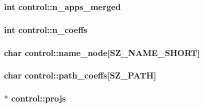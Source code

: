 \subsubsection[{\texorpdfstring{n\+\_\+apps\+\_\+merged}{n_apps_merged}}]{\setlength{\rightskip}{0pt plus 5cm}int control\+::n\+\_\+apps\+\_\+merged}\hypertarget{structcontrol_abbe1758b776d494be512904ee15314ad}{}\label{structcontrol_abbe1758b776d494be512904ee15314ad}
\subsubsection[{\texorpdfstring{n\+\_\+coeffs}{n_coeffs}}]{\setlength{\rightskip}{0pt plus 5cm}int control\+::n\+\_\+coeffs}\hypertarget{structcontrol_ab6adbaa20aa1a77de8bbfa162e591710}{}\label{structcontrol_ab6adbaa20aa1a77de8bbfa162e591710}
\subsubsection[{\texorpdfstring{name\+\_\+node}{name_node}}]{\setlength{\rightskip}{0pt plus 5cm}char control\+::name\+\_\+node\mbox{[}{\bf S\+Z\+\_\+\+N\+A\+M\+E\+\_\+\+S\+H\+O\+RT}\mbox{]}}\hypertarget{structcontrol_a468bfded513333b2191ea4dcecd52d7f}{}\label{structcontrol_a468bfded513333b2191ea4dcecd52d7f}
\subsubsection[{\texorpdfstring{path\+\_\+coeffs}{path_coeffs}}]{\setlength{\rightskip}{0pt plus 5cm}char control\+::path\+\_\+coeffs\mbox{[}{\bf S\+Z\+\_\+\+P\+A\+TH}\mbox{]}}\hypertarget{structcontrol_a4a9fe143850eab7bc8908ae309713005}{}\label{structcontrol_a4a9fe143850eab7bc8908ae309713005}
\subsubsection[{\texorpdfstring{projs}{projs}}]{$\ast$ control\+::projs}\hypertarget{structcontrol_ab8a72c0f5de8d4f3dfe74f75c59116e1}{}\label{structcontrol_ab8a72c0f5de8d4f3dfe74f75c59116e1}
